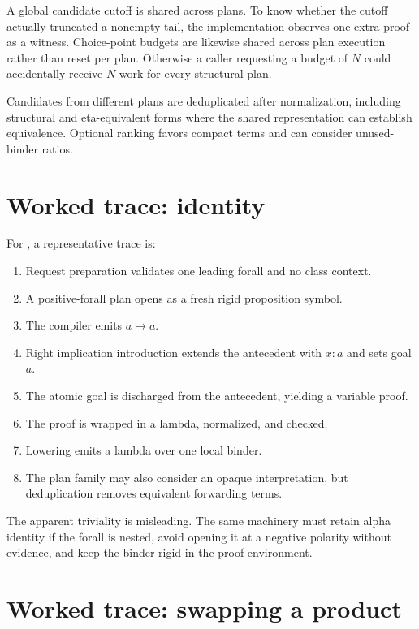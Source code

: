 \documentclass[10pt,letterpaper,oneside]{report}
\newcommand{\code}[1]{\texttt{\detokenize{#1}}}
\begin{document}
A global candidate cutoff is shared across plans. To know whether the cutoff actually truncated a nonempty tail, the implementation observes one extra proof as a witness. Choice-point budgets are likewise shared across plan execution rather than reset per plan. Otherwise a caller requesting a budget of \(N\) could accidentally receive \(N\) work for every structural plan.

Candidates from different plans are deduplicated after normalization, including structural and eta-equivalent forms where the shared representation can establish equivalence. Optional ranking favors compact terms and can consider unused-binder ratios.

\section{Worked trace: identity}

For \code{forall a. a -> a}, a representative trace is:

\begin{enumerate}
  \item Request preparation validates one leading forall and no class context.
  \item A positive-forall plan opens \code{a} as a fresh rigid proposition symbol.
  \item The compiler emits \(a \to a\).
  \item Right implication introduction extends the antecedent with \(x:a\) and sets goal \(a\).
  \item The atomic goal is discharged from the antecedent, yielding a variable proof.
  \item The proof is wrapped in a lambda, normalized, and checked.
  \item Lowering emits a lambda over one local binder.
  \item The plan family may also consider an opaque interpretation, but deduplication removes equivalent forwarding terms.
\end{enumerate}

The apparent triviality is misleading. The same machinery must retain alpha identity if the forall is nested, avoid opening it at a negative polarity without evidence, and keep the binder rigid in the proof environment.

\section{Worked trace: swapping a product}
\end{document}
